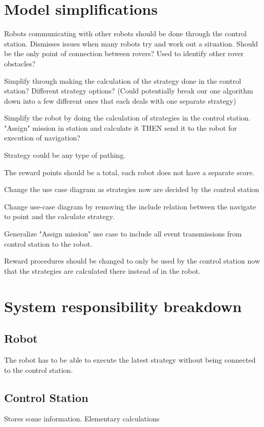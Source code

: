 
\section{Model simplifications}
Robots communicating with other robots should be done through the control station. Dismisses issues when many robots try and work out a situation. Should be the only point of connection between rovers? Used to identify other rover obstacles?

Simplify through making the calculation of the strategy done in the control station? Different strategy options? (Could potentially break our one algorithm down into a few different ones that each deals with one separate strategy)

Simplify the robot by doing the calculation of strategies in the control station. "Assign" mission in station and calculate it THEN send it to the robot for execution of navigation?

Strategy could be any type of pathing.

The reward points should be a total, each robot does not have a separate score.

Change the use case diagram as strategies now are decided by the control station

Change use-case diagram by removing the include relation between the navigate to point and the calculate strategy.

Generalize "Assign mission" use case to include all event transmissions from control station to the robot.

Reward procedures should be changed to only be used by the control station now that the strategies are calculated there instead of in the robot.



\section{System responsibility breakdown}
\subsection{Robot}
The robot has to be able to execute the latest strategy without being connected to the control station. 

\subsection{Control Station}
Stores some information. Elementary calculations

